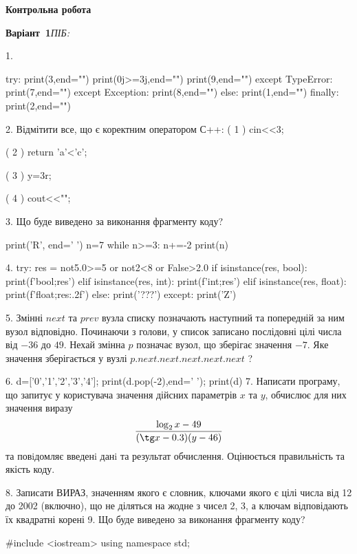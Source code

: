 \documentclass[11pt]{article}
\begin{document}
{\large\textbf{Контрольна робота}}

\textbf{Варіант \No\,1}\hfill \textit{ПІБ:}\,\underline{\hspace{60mm}}
\vspace{4mm}

1. 

try:
    print(3,end="")
    print(0j>=3j,end="")
    print(9,end="")
except TypeError: print(7,end="")
except Exception: print(8,end="")
else: print(1,end="")
finally: print(2,end="")

2. %
Відмітити все, що є коректним оператором С++:
( 1 ) cin<<3;

( 2 ) return 'a'<'c';

( 3 ) y=3^^2;

( 4 ) cout<<"\n";

3. Що буде виведено за виконання фрагменту коду?

print('R', end=' ')
n=7
while n>=3:
    n+=-2
print(n)


4. 
try:
    res = not5.0>=5 or not2<8 or False>2.0
    if isinstance(res, bool):
        print(f'bool;{res}')
    elif isinstance(res, int):
        print(f'int;{res}')
    elif isinstance(res, float):
        print(f'float;{res:.2f}')
    else:
        print('???')
except:
    print('Z')

5. 
Змінні $next$ та $prev$ вузла списку позначають наступний та попередній за ним вузол відповідно. Починаючи з голови, у список записано послідовні цілі числа від $-36$ до $49$. Нехай змінна $p$ позначає вузол, що зберігає значення $-7$.
Яке значення зберігається у вузлі $p.next.next.next.next.next$ ?

6. 
d=['0','1','2','3','4']; print(d.pop(-2),end=' '); print(d)
7. 
Написати програму, що запитує у користувача значення дійсних параметрів $x$ та $y$, обчислює для них значення виразу 
$$\frac{\log_{2} x - 49}{(\tg x - 0.3) (y - 46)}$$ 
та повiдомляє введенi данi та результат обчислення.
 Оцінюється правильність та якість коду.


8. 
Записати ВИРАЗ, значенням якого є словник, ключами якого є цілі числа від 12 до 2002 (включно), що не діляться на жодне з чисел 2, 3, а ключам відповідають їх квадратні корені 
9. Що буде виведено за виконання фрагменту коду?

#include <iostream>
using namespace std;
\end{document}
